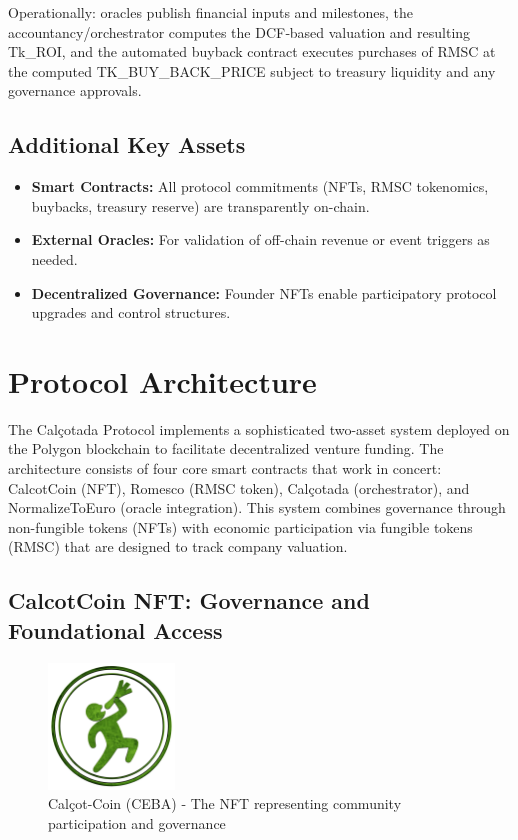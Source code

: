 \documentclass[conference]{IEEEtran}
\begin{document}
Operationally: oracles publish financial inputs and milestones, the accountancy/orchestrator computes the DCF‑based valuation and resulting Tk_ROI, and the automated buyback contract executes purchases of RMSC at the computed TK_BUY_BACK_PRICE subject to treasury liquidity and any governance approvals.


\subsection{Additional Key Assets}
\begin{itemize}
    \item \textbf{Smart Contracts:} All protocol commitments (NFTs, RMSC tokenomics, buybacks, treasury reserve) are transparently on-chain.
    \item \textbf{External Oracles:} For validation of off-chain revenue or event triggers as needed.
    \item \textbf{Decentralized Governance:} Founder NFTs enable participatory protocol upgrades and control structures.
\end{itemize}

\section{Protocol Architecture}


% 

The Calçotada Protocol implements a sophisticated two-asset system deployed on the Polygon blockchain to facilitate decentralized venture funding. The architecture consists of four core smart contracts that work in concert: CalcotCoin (NFT), Romesco (RMSC token), Calçotada (orchestrator), and NormalizeToEuro (oracle integration). This system combines governance through non-fungible tokens (NFTs) with economic participation via fungible tokens (RMSC) that are designed to track company valuation.

\subsection{CalcotCoin NFT: Governance and Foundational Access}

\begin{figure}[ht]
\centering
\includegraphics[width=0.3\textwidth]{calcot-coin-logo.png}
\caption{Calçot-Coin (CEBA) - The NFT representing community participation and governance}
\label{fig:calcotcoin-logo}
\end{figure}
\end{document}
